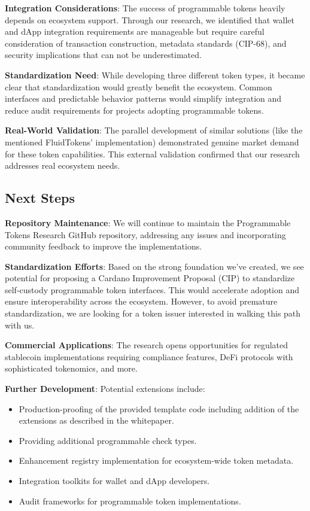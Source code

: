 \medskip{}

\noindent{}\textbf{Integration Considerations}: The success of programmable tokens heavily depends on ecosystem support. Through our research, we identified that wallet and dApp integration requirements are manageable but require careful consideration of transaction construction, metadata standards (CIP-68), and security implications that can not be underestimated.

\medskip{}

\noindent{}\textbf{Standardization Need}: While developing three different token types, it became clear that standardization would greatly benefit the ecosystem. Common interfaces and predictable behavior patterns would simplify integration and reduce audit requirements for projects adopting programmable tokens.

\medskip{}

\noindent{}\textbf{Real-World Validation}: The parallel development of similar solutions (like the mentioned FluidTokens' implementation) demonstrated genuine market demand for these token capabilities. This external validation confirmed that our research addresses real ecosystem needs.

\subsection{Next Steps}
\noindent{}\textbf{Repository Maintenance}: We will continue to maintain the Programmable Tokens Research GitHub repository, addressing any issues and incorporating community feedback to improve the implementations.

\medskip{}

\noindent{}\textbf{Standardization Efforts}: Based on the strong foundation we've created, we see potential for proposing a Cardano Improvement Proposal (CIP) to standardize self-custody programmable token interfaces. This would accelerate adoption and ensure interoperability across the ecosystem. However, to avoid premature standardization, we are looking for a token issuer interested in walking this path with us.

\medskip{}

\noindent{}\textbf{Commercial Applications}: The research opens opportunities for regulated stablecoin implementations requiring compliance features, DeFi protocols with sophisticated tokenomics, and more.

\medskip{}

\noindent{}\textbf{Further Development}: Potential extensions include:
\begin{itemize}
\item Production-proofing of the provided template code including addition of the extensions as described in the whitepaper.
\item Providing additional programmable check types.
\item Enhancement registry implementation for ecosystem-wide token metadata.
\item Integration toolkits for wallet and dApp developers.
\item Audit frameworks for programmable token implementations.
\end{itemize}

